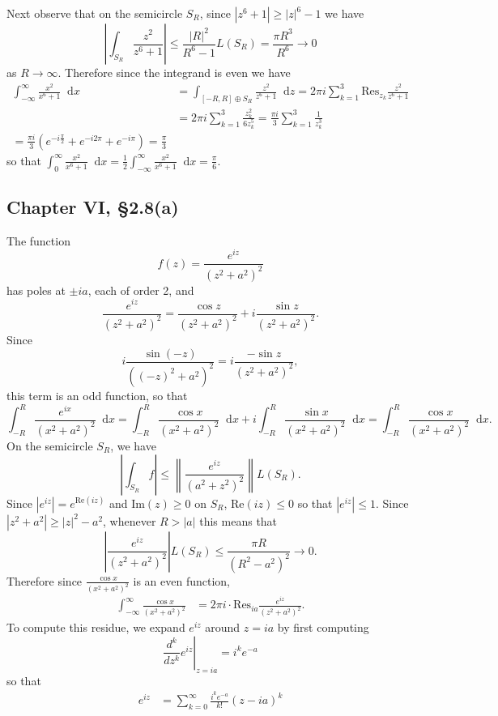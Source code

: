 \documentclass{article}
\newcommand\Res{\mathrm{Res}}
\renewcommand\Im{\mathrm{Im}}
\renewcommand\Re{\mathrm{Re}}
\newcommand\dif{\mathop{}\!\mathrm{d}}
\begin{document}
\begin{enumerate}[(a)]
{    Next observe that on the semicircle $S_R$,
    since $|z^6 + 1| \geq |z|^6 - 1$ we have
    $$
         \left|
           \int_{S_R}
             \frac{z^2}{z^6 + 1}
         \right|
    \leq \frac{|R|^2}{R^6 - 1}  L(S_R)
    =    \frac{\pi R^3}{R^6}
    \to  0
    $$
    as $R \to \infty$. Therefore since the integrand
    is even we have
    \begin{align*}
        \int_{-\infty}^\infty
          \frac{x^2}{x^6 + 1}
          \dif x
     &= \int_{[-R, R] \oplus S_R}
          \frac{z^2}{z^6 + 1}
          \dif z
      = 2 \pi i
        \sum_{k=1}^3
          \Res_{z_k} \frac{z^2}{z^6 + 1} \\
     &= 2 \pi i
         \sum_{k=1}^3
           \frac{z_k^2}{6z_k^5}
      = \frac{\pi i}{3}
          \sum_{k=1}^3
            \frac{1}{z_k^{3}} \\
      = \frac{\pi i}{3}
          ( e^{-i \frac{\pi}{2}}
          + e^{-i 2 \pi}
          + e^{-i \pi})
      = \frac{\pi}{3}
    \end{align*}
    so that
    $ \int_{0}^\infty \frac{x^2}{x^6 + 1} \dif x
    = \frac{1}{2}\int_{-\infty}^\infty \frac{x^2}{x^6 + 1} \dif x
    = \frac{\pi}{6}$.
  }
\end{enumerate}

\subsection*{Chapter VI, \S 2.8(a)}
The function
$$
f(z) = \frac{e^{iz}}{(z^2 + a^2)^2}
$$
has poles at $\pm i a$, each of order 2, and
$$
  \frac{e^{iz}}{(z^2 + a^2)^2}
= \frac{\cos z}{(z^2 + a^2)^2}
+ i \frac{\sin z}{(z^2 + a^2)^2}.
$$
Since
$$
  i\frac{\sin (-z)}{((-z)^2 + a^2)^2}
= i\frac{-\sin z}{(z^2 + a^2)^2},
$$
this term is an odd function, so that
$$
  \int_{-R}^R
    \frac{e^{ix}}{(x^2 + a^2)^2}
    \dif x
= \int_{-R}^R
    \frac{\cos x}{(x^2 + a^2)^2}
    \dif x
+ i \int_{-R}^R
    \frac{\sin x}{(x^2 + a^2)^2}
    \dif x
= \int_{-R}^R
    \frac{\cos x}{(x^2 + a^2)^2}
    \dif x.
$$
On the semicircle $S_R$, we have
$$
     \left|
       \int_{S_R} f
     \right|
\leq \left\|
       \frac{e^{iz}}
            {(a^2 + z^2)^2}
     \right\|
     L(S_R).
$$
Since $|e^{iz}| = e^{\Re(iz)}$ and
$\Im(z) \geq 0$ on $S_R$,
$\Re(iz) \leq 0$ so that $|e^{iz}| \leq 1$.
Since $|z^2 + a^2| \geq |z|^2 - a^2$, whenever
$R > |a|$ this means that
$$
     \left|
       \frac{e^{iz}}
            {(z^2 + a^2)^2}
     \right| L(S_R)
\leq \frac{\pi R}{(R^2 - a^2)^2}
\to  0.
$$
Therefore since $\frac{\cos x}{(x^2 + a^2)^2}$ is an
even function,
\begin{align*}
    \int_{-\infty}^\infty
      \frac{\cos x}
           {(x^2 + a^2)^2}
&= 2 \pi i \cdot
   \Res_{ia} \frac{e^{iz}}{(z^2 + a^2)^2}.
\end{align*}
To compute this residue, we expand $e^{iz}$ around $z = ia$
by first computing
$$
  \left.\frac{d^k}{dz^k} e^{iz}\right|_{z = ia}
= i^k e^{-a}
$$
so that
\begin{align*}
  e^{iz}
&= \sum_{k=0}^\infty
     \frac{i^k e^{-a}}{k!}
     (z - ia)^k
\end{align*}
\end{document}
